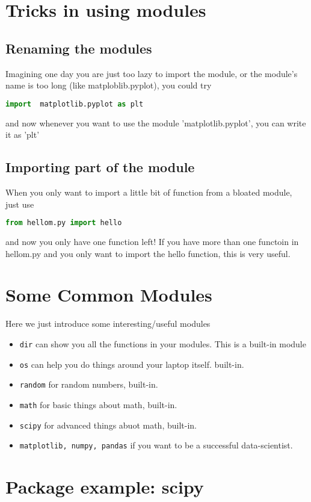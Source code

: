 \documentclass[12pt]{article}
\begin{document}
\section{Tricks in using modules}
\subsection{Renaming the modules}
Imagining one day you are just too lazy to import the module, or the module's name is too long (like matploblib.pyplot), you could try
\begin{lstlisting}[language=python,caption=alias]
	import  matplotlib.pyplot as plt
\end{lstlisting}

and now whenever you want to use the module 'matplotlib.pyplot', you can write it as 'plt'
\subsection{Importing part of the module}
When you only want to import a little bit of function from a bloated module, just use
\begin{lstlisting}[language=python,caption=import part]
	from hellom.py import hello
\end{lstlisting}
and now you only have one function left! If you have more than one functoin in hellom.py and you only want to import the hello function, this is very useful.
\section{Some Common Modules}
Here we just introduce some interesting/useful modules
\begin{itemize}
	\item \texttt{dir} can show you all the functions in your modules. This is a built-in module
	\item \texttt{os} can help you do things around your laptop itself. built-in.
	\item \texttt{random} for random numbers, built-in.
	\item \texttt{math} for basic things about math, built-in.
	\item \texttt{scipy} for advanced things abuot math, built-in.
	\item \texttt{matplotlib, numpy, pandas} if you want to be a successful data-scientist.
\end{itemize}
\section{Package example: scipy}
\end{document}
